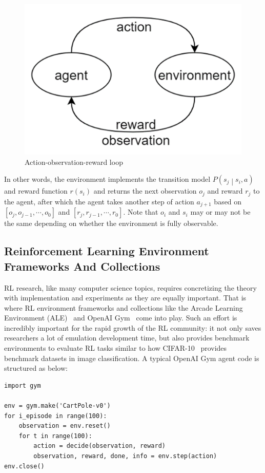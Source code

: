 \begin{figure}[htp]
    \centering
    \includegraphics{images/obr-loop.png}
    \caption{Action-observation-reward loop}
    \label{fig:obr-loop}
\end{figure}

In other words, the environment implements the transition model $P\left(s_j\middle| s_i,a\right)$ and reward function $r\left(s_i\right)$ and returns the next observation $o_j$ and reward $r_j$ to the agent, after which the agent takes another step of action $a_{j+1}$ based on $\left[o_j,o_{j-1},\cdots,o_0\right]$ and $\left[r_j,r_{j-1},\cdots,r_0\right]$. Note that $o_i$ and $s_i$ may or may not be the same depending on whether the environment is fully observable.

\subsection{Reinforcement Learning Environment Frameworks And Collections}
RL research, like many computer science topics, requires concretizing the theory with implementation and experiments as they are equally important. That is where RL environment frameworks and collections like the Arcade Learning Environment (ALE)~\cite{ale} and OpenAI Gym~\cite{openai-gym} come into play. Such an effort is incredibly important for the rapid growth of the RL community: it not only saves researchers a lot of emulation development time, but also provides benchmark environments to evaluate RL tasks similar to how CIFAR-10~\cite{cifar-10} provides benchmark datasets in image classification. A typical OpenAI Gym agent code is structured as below:

\begin{code}
\begin{verbatim}
import gym

env = gym.make('CartPole-v0')
for i_episode in range(100):
    observation = env.reset()
    for t in range(100):
        action = decide(observation, reward)
        observation, reward, done, info = env.step(action)
env.close()
\end{verbatim}
\label{code:gym-agent}
\end{code}

